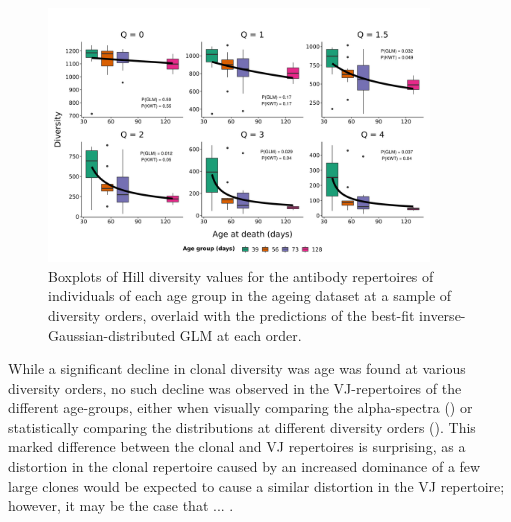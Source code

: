 \begin{figure}
\centering
\includegraphics[width = 0.9\textwidth]{_Figures/png/ageing-clone-diversity-solo-fit-igauss}
\caption{Boxplots of Hill diversity values for the antibody repertoires of individuals of each age group in the \igseq ageing dataset at a sample of diversity orders, overlaid with the predictions of the best-fit inverse-Gaussian-distributed GLM at each order.}
\label{fig:igseq-ageing-clone-diversity-solo-fit-igauss}
\end{figure}

While a significant decline in clonal diversity was age was found at various diversity orders, no such decline was observed in the VJ-repertoires of the different age-groups, either when visually comparing the alpha-spectra () or statistically comparing the distributions at different diversity orders (). This marked difference between the clonal and VJ repertoires is surprising, as a distortion in the clonal repertoire caused by an increased dominance of a few large clones would be expected to cause a similar distortion in the VJ repertoire; however, it may be the case that ... . %

